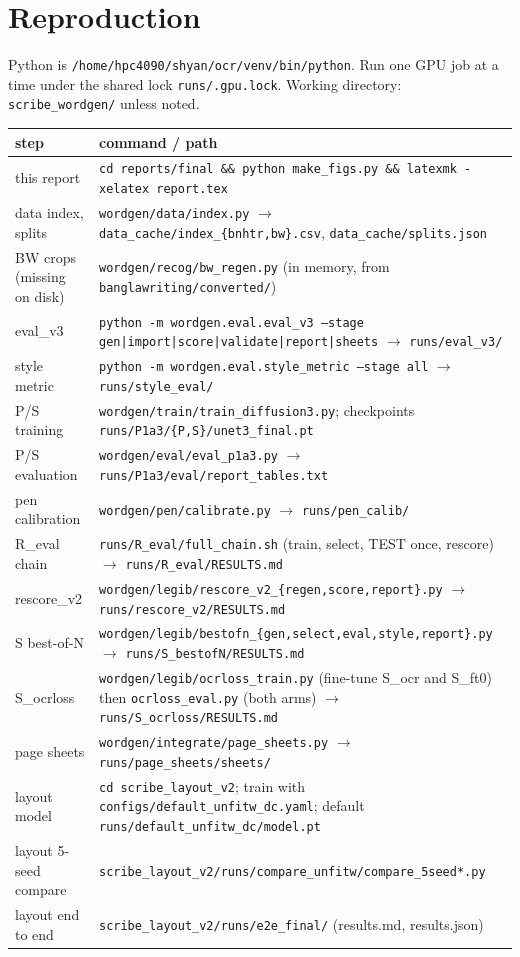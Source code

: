 \documentclass[10.5pt,a4paper]{article}
\newcommand{\fp}[1]{\nolinkurl{#1}}
\begin{document}
\appendix
\section{Reproduction}
\label{app:repro}
Python is \fp{/home/hpc4090/shyan/ocr/venv/bin/python}. Run one GPU job at a time under the shared lock
\fp{runs/.gpu.lock}. Working directory: \fp{scribe_wordgen/} unless noted.

\begin{table}[H]
\centering
\small
\begin{tabular}{@{}p{3.4cm}p{12.2cm}@{}}
\toprule
step & command / path \\
\midrule
this report & \texttt{cd reports/final \&\& python make\_figs.py \&\& latexmk -xelatex report.tex} \\
data index, splits & \fp{wordgen/data/index.py} $\to$ \fp{data_cache/index_{bnhtr,bw}.csv}, \fp{data_cache/splits.json} \\
BW crops (missing on disk) & \fp{wordgen/recog/bw_regen.py} (in memory, from \fp{banglawriting/converted/}) \\
eval\_v3 & \texttt{python -m wordgen.eval.eval\_v3 --stage gen|import|score|validate|report|sheets} $\to$ \fp{runs/eval_v3/} \\
style metric & \texttt{python -m wordgen.eval.style\_metric --stage all} $\to$ \fp{runs/style_eval/} \\
P/S training & \fp{wordgen/train/train_diffusion3.py}; checkpoints \fp{runs/P1a3/{P,S}/unet3_final.pt} \\
P/S evaluation & \fp{wordgen/eval/eval_p1a3.py} $\to$ \fp{runs/P1a3/eval/report_tables.txt} \\
pen calibration & \fp{wordgen/pen/calibrate.py} $\to$ \fp{runs/pen_calib/} \\
R\_eval chain & \fp{runs/R_eval/full_chain.sh} (train, select, TEST once, rescore) $\to$ \fp{runs/R_eval/RESULTS.md} \\
rescore\_v2 & \fp{wordgen/legib/rescore_v2_{regen,score,report}.py} $\to$ \fp{runs/rescore_v2/RESULTS.md} \\
S best-of-N & \fp{wordgen/legib/bestofn_{gen,select,eval,style,report}.py} $\to$ \fp{runs/S_bestofN/RESULTS.md} \\
S\_ocrloss & \fp{wordgen/legib/ocrloss_train.py} (fine-tune S\_ocr and S\_ft0) then \fp{ocrloss_eval.py} (both arms)
$\to$ \fp{runs/S_ocrloss/RESULTS.md} \\
page sheets & \fp{wordgen/integrate/page_sheets.py} $\to$ \fp{runs/page_sheets/sheets/} \\
layout model & \texttt{cd scribe\_layout\_v2}; train with \fp{configs/default_unfitw_dc.yaml}; default \fp{runs/default_unfitw_dc/model.pt} \\
layout 5-seed compare & \fp{scribe_layout_v2/runs/compare_unfitw/compare_5seed*.py} \\
layout end to end & \fp{scribe_layout_v2/runs/e2e_final/} (results.md, results.json) \\
\bottomrule
\end{tabular}
\end{table}
\end{document}
